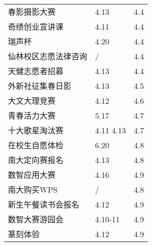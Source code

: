 \documentclass[letterpaper, 12pt]{article}
\begin{document}
\begin{multicols}{2}
{\begin{longtable}{|>{\centering\arraybackslash}m{}|m{}|m{}|}
    春影摄影大赛 & 4.13 & 4.4\\
    奇绩创业宣讲课 & 4.11 & 4.4\\
    瑞声杯 & 4.20 & 4.4\\
    仙林校区志愿法律咨询 & / & 4.4\\
    天健志愿者招募 & 4.13 & 4.4\\
    外新社征集春日影 & 4.13 & 4.5\\
    大文大理竞赛 & 4.12 & 4.6\\
    青春活力大赛 & 5.17 & 4.7\\
    十大歌星淘汰赛 & 4.11 4.13 & 4.7\\
    在校生自愿体检 & 6.20 & 4.8\\
    南大定向赛报名 & 4.13 & 4.8\\
    数智应用大赛 & 4.16 & 4.9\\
    南大购买WPS & / & 4.8\\
    新生午餐读书会报名 & 4.12 & 4.9\\
    数智大赛游园会 & 4.10-11 & 4.9\\
    篆刻体验 & 4.12 & 4.9\\
    \hline
\end{longtable}
\unskip
\unpenalty
\unpenalty}\unvbox\colbbox
\end{multicols}
\end{document}
